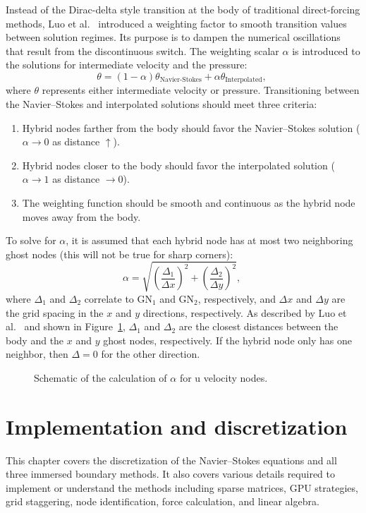 Instead of the Dirac-delta style transition at the body of traditional direct-forcing methods, Luo et al.~\cite{Luo:2012gx} introduced a weighting factor to smooth transition values between solution regimes. 
Its purpose is to dampen the numerical oscillations that result from the discontinuous switch. 
The weighting scalar $\alpha$ is introduced to the solutions for intermediate velocity and the pressure:
\begin{equation}\label{eq:Weight}
\theta = \left(1-\alpha \right)\theta_{\text{Navier-Stokes}} + \alpha \theta_{\text{Interpolated}}, \;
\end{equation}
where $\theta$ represents either intermediate velocity or pressure.
Transitioning between the Navier--Stokes and interpolated solutions should meet three criteria:
\begin{enumerate}
	\item Hybrid nodes farther from the body should favor the Navier--Stokes solution ($\alpha \rightarrow 0$ as distance $\uparrow$).
	\item Hybrid nodes closer to the body should favor the interpolated solution ($\alpha \rightarrow 1$ as distance $ \rightarrow 0$).
	\item The weighting function should be smooth and continuous as the hybrid node moves away from the body.
\end{enumerate}
To solve for $\alpha$, it is assumed that each hybrid node has at most two neighboring ghost nodes (this will not be true for sharp corners):
\begin{equation}
\alpha = \sqrt{\left(\frac{\Delta_1}{\Delta x}\right)^2 + \left(\frac{\Delta_2}{\Delta y}\right)^2}, \;
\label{eq:Alpha}
\end{equation}
where $\Delta_1$ and $\Delta_2$ correlate to GN$_1$ and GN$_2$, respectively, and $\Delta x$ and $\Delta y$ are the grid spacing in the $x$ and $y$ directions, respectively. 
As described by Luo et al.~\cite{Luo:2012gx} and shown in Figure~\ref{fig:Weight}, $\Delta_1$ and $\Delta_2$ are the closest distances between the body and the $x$ and $y$ ghost nodes, respectively. 
If the hybrid node only has one neighbor, then $\Delta=0$ for the other direction. 
\begin{figure}[!htb]
	\centering
	
	\caption{Schematic of the calculation of $\alpha$ for u velocity nodes.}
	\label{fig:Weight}
\end{figure}

\chapter{Implementation and discretization}\label{chapter:Implementation}
This chapter covers the discretization of the Navier--Stokes equations and all three immersed boundary methods.
It also covers various details required to implement or understand the methods including sparse matrices, GPU strategies, grid staggering, node identification, force calculation, and linear algebra. 

